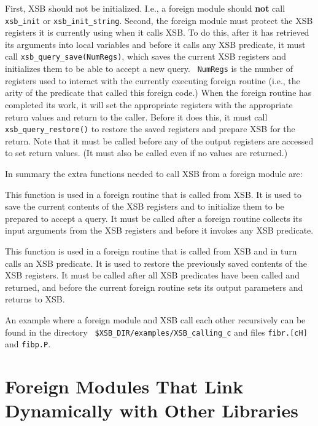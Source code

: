 First, XSB should not be initialized.  I.e., a foreign module should
{\bf not} call {\tt xsb\_init} or {\tt xsb\_init\_string}.  Second, the
foreign module must protect the XSB registers it is currently using
when it calls XSB.  To do this, after it has retrieved its arguments
into local variables and before it calls any XSB predicate, it must
call {\tt xsb\_query\_save(NumRegs)}, which saves the current XSB
registers and initializes them to be able to accept a new query.  {\tt
NumRegs} is the number of registers used to interact with the
currently executing foreign routine (i.e., the arity of the predicate
that called this foreign code.)  When the foreign routine has
completed its work, it will set the appropriate registers with the
appropriate return values and return to the caller.  Before it does
this, it must call {\tt xsb\_query\_restore()} to restore the saved
registers and prepare XSB for the return.  Note that it must be called
before any of the output registers are accessed to set return values.
(It must also be called even if no values are returned.)

In summary the extra functions needed to call XSB from a foreign
module are:

\begin{description}

%
 This function is used in a foreign routine that is called from XSB.
 It is used to save the current contents of the XSB registers and to
 initialize them to be prepared to accept a query.  It must be called
 after a foreign routine collects its input arguments from the XSB
 registers and before it invokes any XSB predicate.

%
This function is used in a foreign routine that is called from XSB and
in turn calls an XSB predicate.  It is used to restore the previously
saved contents of the XSB registers.  It must be called after all XSB
predicates have been called and returned, and before the current
foreign routine sets its output parameters and returns to XSB.

\end{description}

An example where a foreign module and XSB call each other recursively
can be found in the directory {\tt
  \$XSB\_DIR/examples/XSB\_calling\_c} and files {\tt fibr.[cH]} and
{\tt fibp.P}.


\section{Foreign Modules That Link Dynamically with Other Libraries}

